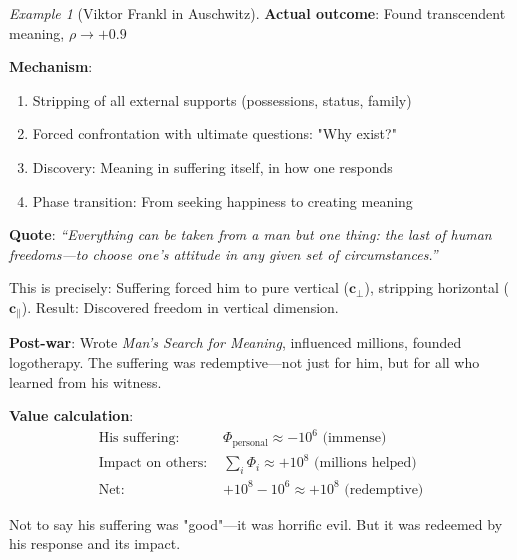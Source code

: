 \documentclass[11pt,a4paper]{article}
\theoremstyle{definition}
\theoremstyle{remark}
\newtheorem{example}{Example}[section]
\newcommand{\cc}{\mathbf{c}}
\begin{document}
\begin{small}
\begin{enumerate}
\begin{example}[Viktor Frankl in Auschwitz]
\textbf{Actual outcome}: Found transcendent meaning, \(\rho \to +0.9\)

\textbf{Mechanism}:
\begin{enumerate}
    \item Stripping of all external supports (possessions, status, family)
    \item Forced confrontation with ultimate questions: "Why exist?"
    \item Discovery: Meaning in suffering itself, in how one responds
    \item Phase transition: From seeking happiness to creating meaning
\end{enumerate}

\textbf{Quote}: \textit{``Everything can be taken from a man but one thing: the last of human freedoms—to choose one's attitude in any given set of circumstances.''}

This is precisely: Suffering forced him to pure vertical (\(\cc_\perp\)), stripping horizontal (\(\cc_\parallel\)). Result: Discovered freedom in vertical dimension.

\textbf{Post-war}: Wrote \textit{Man's Search for Meaning}, influenced millions, founded logotherapy. The suffering was redemptive—not just for him, but for all who learned from his witness.

\textbf{Value calculation}:
\begin{align}
\text{His suffering: } &\Phi_{\text{personal}} \approx -10^6 \text{ (immense)} \\
\text{Impact on others: } &\sum_i \Phi_i \approx +10^8 \text{ (millions helped)} \\
\text{Net: } &+10^8 - 10^6 \approx +10^8 \text{ (redemptive)}
\end{align}

Not to say his suffering was "good"—it was horrific evil. But it was redeemed by his response and its impact.
\end{example}

\begin{figure}[H]
\centering
{}
\end{figure}
\end{enumerate}
\end{small}
\end{document}
